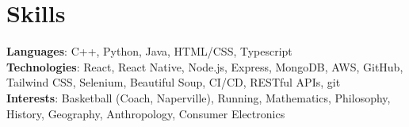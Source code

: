 \documentclass[letterpaper,11pt]{article}
\makeatletter
\newcommand{\resumeItem}[1]{
  \item\small{#1}
    {\vspace{-2pt}}
  }
\newcommand{\resumeSubheading}[4]{
  \vspace{-2pt}\item
    \begin{tabular*}{0.97\textwidth}[t]{l@{\extracolsep{\fill}}r}
      \vspace{0pt}
      \textbf{\small#1} & \small#2 \\
      \vspace{0pt}
      \textit{\small#3} & \textit{\small #4} \\
    \end{tabular*}\vspace{-2pt}
}
\newcommand{\resumeSubHeadingListEnd}{\end{itemize}}
\newcommand{\resumeItemListStart}{\begin{itemize}[leftmargin=*]\vspace{-2pt}}
\newcommand{\resumeItemListEnd}{\end{itemize}\vspace{-5pt}}
\makeatother
\begin{document}



\section{Skills}
\begin{itemize}[leftmargin=0.15in, label={}]
   \small{\item{
    \textbf{Languages}{: C++, Python, Java, HTML/CSS, Typescript} \\
    \textbf{Technologies}{: React, React Native, Node.js, Express, MongoDB, AWS, GitHub, Tailwind CSS, Selenium, Beautiful Soup, CI/CD, RESTful APIs, git} \\
    \textbf{Interests}{: Basketball (Coach, Naperville), Running, Mathematics, Philosophy, History, Geography, Anthropology, Consumer Electronics}
   }}
\end{itemize}
\end{document}
